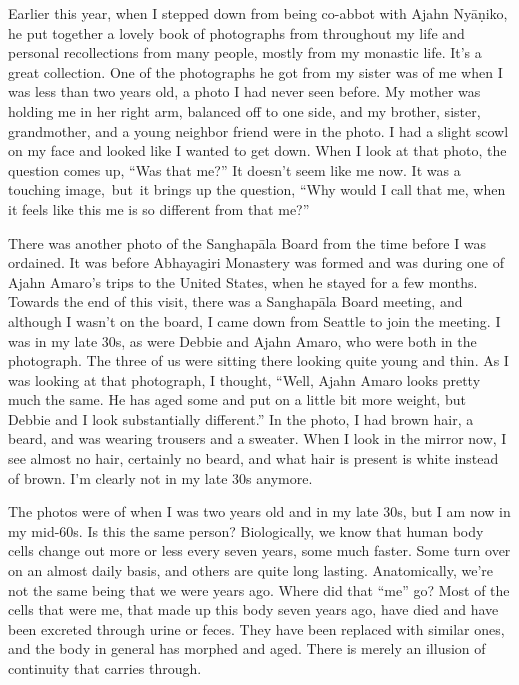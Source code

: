 Earlier this year, when I stepped down from being co-abbot with Ajahn Nyāṇiko, he put together a lovely book of photographs from throughout my life and personal recollections from many people, mostly from my monastic life. It's a great collection. One of the photographs he got from my sister was of me when I was less than two years old, a photo I had never seen before. My mother was holding me in her right arm, balanced off to one side, and my brother, sister, grandmother, and a young neighbor friend were in the photo. I had a slight scowl on my face and looked like I wanted to get down. When I look at that photo, the question comes up, ``Was that me?'' It doesn't seem like me now. It was a touching \mbox{image, but it} brings up the question, ``Why would I call that me, when \linebreak it feels like this me is so different from that me?''

\enlargethispage{1\baselineskip}
There was another photo of the Sanghapāla Board from the time before I was ordained. It was before Abhayagiri Monastery was formed and was during one of Ajahn Amaro's trips to the United States, when he stayed for a few months. Towards the end of this visit, there was a Sanghapāla Board meeting, and although I wasn't on the board, I came down from Seattle to join the meeting. I was in my late 30s, as were Debbie and Ajahn Amaro, who were both in the photograph. The three of us were sitting there looking quite young and thin. As I was looking at that photograph, I thought, ``Well, Ajahn Amaro looks pretty much the same. He has aged some and put on a little bit more weight, but Debbie and I look substantially different.'' In the photo, I had brown hair, a beard, and was wearing trousers and a sweater. When I look in the mirror now, I see almost no hair, certainly no beard, and what hair is present is white instead of brown. I'm clearly not in my late 30s anymore.

The photos were of when I was two years old and in my late 30s, but I am now in my mid-60s. Is this the same person? Biologically, we know that human body cells change out more or less every seven years, some much faster. Some turn over on an almost daily basis, and others are quite long lasting. Anatomically, we're not the same being that we were years ago. Where did that ``me'' go? Most of the cells that were me, that made up this body seven years ago, have died and have been excreted through urine or feces. They have been replaced with similar ones, and the body in general has morphed and aged. There is merely an illusion of continuity that carries through.

